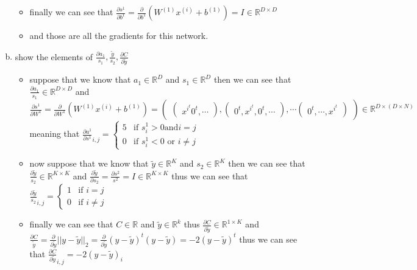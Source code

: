 \documentclass{article}
\begin{document}
\begin{enumerate}[(a)]
\begin{itemize}
    \item finally we can see that $\frac{\partial s^{1}}{\partial b^{1}}=\frac{\partial}{\partial b^{1}}(W^{(1)}x^{(i)}+b^{(1)})=I\in \mathbb{R}^{D\times D}$
    \item and those are all the gradients for this network.
     \end{itemize}
\item show the elements of $\frac{\partial a_{1}}{s_{1}}, \frac{\tilde{y}}{s_2}, \frac{\partial C}{\partial \tilde{y}}$
\begin{itemize}
    \color{blue}
    \item suppose that we know that $a_1\in \mathbb{R}^{D}$ and $s_1\in \mathbb{R}^{D}$ then we can see that $\frac{\partial a_{1}}{s_{1}}\in \mathbb{R}^{D\times D}$ and  $\frac{\partial s^{1}}{\partial W^{1}}=\frac{\partial}{\partial W^{1}}(W^{(1)}x^{(i)}+b^{(1)})=\begin{pmatrix}
        \begin{pmatrix}
            x^{{i}^{t}} 0^{t}, \cdots
        \end{pmatrix} ,  \begin{pmatrix}
            0^{t},x^{{i}^{t}}, 0^{t}, \cdots
        \end{pmatrix}, \cdots     \begin{pmatrix}
        0^{t}, \cdots,  x^{{i}^{t}}
        \end{pmatrix}
        \end{pmatrix}\in \mathbb{R}^{D \times (D\times N)}$ meaning that $\frac{\partial a^{1}}{\partial s^{1}}_{i,j}=\begin{cases}
            5& \text{if }s^{1}_{i} > 0 \text{and} i=j \\
            0 & \text{if }s^{1}_{i} < 0 \text{ or } i\neq j
            \end{cases}$
    \item now suppose that we know that $\tilde{y}\in \mathbb{R}^{K}$ and $s_2\in \mathbb{R}^{K}$ then we can see that $\frac{\partial \tilde{y}}{s_2}\in \mathbb{R}^{K\times K}$ and $\frac{\partial \tilde{y}}{\partial s_2}=\frac{\partial s^{2}}{s^{2}} = I\in \mathbb{R}^{K\times K} $ thus we can see that $\frac{\partial \tilde{y}}{s_2}_{i,j}=\begin{cases}
        1& \text{if }i=j \\
        0 & \text{if }i\neq j
        \end{cases}$
    \item finally we can see that $C\in \mathbb{R}$ and $\tilde{y}\in \mathbb{R}^{k}$ thus $\frac{\partial C}{\partial \tilde{y}}\in \mathbb{R}^{1\times K}$ and $\frac{\partial C}{\tilde{y}}=\frac{\partial}{\partial \tilde{y}}||y-\tilde{y}||_{2}=\frac{\partial}{\partial \tilde{y}}(y-\tilde{y})^{t}(y-\tilde{y})=-2(y-\tilde{y})^{t}$ thus we can see that $\frac{\partial C}{\partial \tilde{y}}_{i,j}=-2(y-\tilde{y})_{i}$
\end{itemize}

\end{enumerate}
\end{document}
